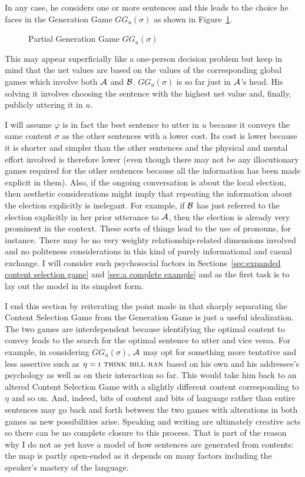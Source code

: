 In any case, he considers one or more sentences and this leads to the choice he faces in the Generation Game $GG_u(\sigma)$ as shown in Figure~\ref{fig:GG}.

\begin{figure}[h] 

\caption{Partial Generation Game $GG_u(\sigma)$}
\label{fig:GG}
\end{figure}

This may appear superficially like a one-person decision problem but keep in mind that the net values are based on the values of the corresponding global games which involve both $\cal A$ and $\cal B$. $GG_u(\sigma)$ is so far just in $\cal A$'s head. His solving it involves choosing the sentence with the highest net value and, finally, publicly uttering it in $u$.

I will assume $\varphi$ is in fact the best sentence to utter in $u$ because it conveys the same content $\sigma$ as the other sentences with a lower cost. Its cost is lower because it is shorter and simpler than the other sentences and the physical and mental effort involved is therefore lower (even though there may not be any illocutionary games required for the other sentences because all the information has been made explicit in them). Also, if the ongoing conversation is about the local election, then aesthetic considerations might imply that repeating the information about the election explicitly is inelegant. For example, if $\cal B$ has just referred to the election explicitly in her prior utterance to $\cal A$, then the election is already very prominent in the context. These sorts of things lead to the use of pronouns, for instance. There may be no very weighty relationship-related dimensions involved and no politeness considerations in this kind of purely informational and casual exchange. I will consider such psychosocial factors in Sections~\ref{sec:expanded content selection game} and \ref{sec:a complete example} and  as the first task is to lay out the model in its simplest form.

I end this section by reiterating the point made in  that sharply separating the Content Selection Game from the Generation Game is just a useful idealization. The two games are interdependent because identifying the optimal content to convey leads to the search for the optimal sentence to utter and vice versa. For example, in considering $GG_u(\sigma)$, $\cal A$ may opt for something more tentative and less assertive such as $\eta = \Expression{I think Bill ran}$ based on his own and his addressee's psychology as well as on their interaction so far. This would take him back to an altered Content Selection Game with a slightly different content corresponding to $\eta$ and so on. And, indeed, bits of content and bits of language rather than entire sentences may go back and forth between the two games with alterations in both games as new possibilities arise. Speaking and writing are ultimately creative acts so there can be no complete closure to this process. That is part of the reason why I do not as yet have a model of how sentences are generated from contents: the map is partly open-ended as it depends on many factors including the speaker's mastery of the language.

